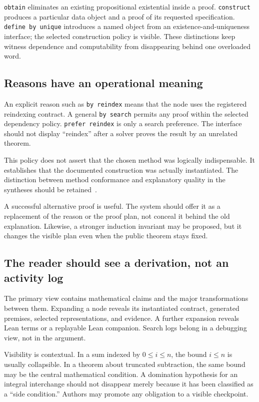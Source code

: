 \documentclass[11pt,letterpaper]{article}
\newcommand{\code}[1]{\nolinkurl{#1}}
\theoremstyle{definition}
\theoremstyle{remark}
\begin{document}
\code{obtain} eliminates an existing propositional existential inside a proof.
\code{construct} produces a particular data object and a proof of its requested
specification. \code{define by unique} introduces a named object from an
existence-and-uniqueness interface; the selected construction policy is visible.
These distinctions keep witness dependence and computability from disappearing
behind one overloaded word.

\subsection{Reasons have an operational meaning}
An explicit reason such as \code{by reindex} means that the node uses the
registered reindexing contract. A general \code{by search} permits any proof
within the selected dependency policy. \code{prefer reindex} is only a search
preference. The interface should not display ``reindex'' after a solver proves
the result by an unrelated theorem.

This policy does not assert that the chosen method was logically indispensable.
It establishes that the documented construction was actually instantiated.
The distinction between method conformance and explanatory quality in the
syntheses should be retained~\cite{synthesis,blueprints}.

A successful alternative proof is useful. The system should offer it as a
replacement of the reason or the proof plan, not conceal it behind the old
explanation. Likewise, a stronger induction invariant may be proposed, but it
changes the visible plan even when the public theorem stays fixed.

\subsection{The reader should see a derivation, not an activity log}
The primary view contains mathematical claims and the major transformations
between them. Expanding a node reveals its instantiated contract, generated
premises, selected representations, and evidence. A further expansion reveals
Lean terms or a replayable Lean companion. Search logs belong in a debugging
view, not in the argument.

Visibility is contextual. In a sum indexed by $0\leq i\leq n$, the bound $i\leq n$
is usually collapsible. In a theorem about truncated subtraction, the same
bound may be the central mathematical condition. A domination hypothesis for
an integral interchange should not disappear merely because it has been
classified as a ``side condition.'' Authors may promote any obligation to a
visible checkpoint.
\end{document}
